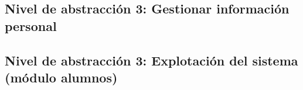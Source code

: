 \subsection{Nivel de abstracción 3: Gestionar información personal}



\subsection{Nivel de abstracción 3: Explotación del sistema (\-mó\-dulo alumnos)}

